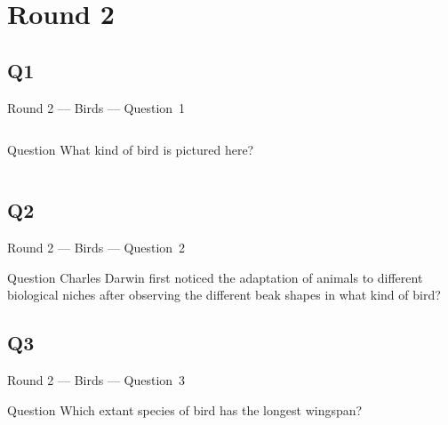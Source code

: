\documentclass[11pt]{beamer}
\begin{document}
\section{Round 2}
\subsection*{Q1}
\begin{frame}[t]{Round 2 --- Birds --- \mbox{Question 1}}
    \vspace{-0.5em}
    \begin{columns}[T,totalwidth=\linewidth]
        \begin{column}{0.32\linewidth}
            \begin{block}{Question}
                What kind of bird is pictured here?
            \end{block}
        \end{column}
        \begin{column}{0.65\linewidth}
            \begin{center}
                \texttt{[image: \{Images/starling]}.jpg}
            \end{center}
        \end{column}
    \end{columns}
\end{frame}
\subsection*{Q2}
\begin{frame}[t]{Round 2 --- Birds --- \mbox{Question 2}}
    \vspace{-0.5em}
    \begin{block}{Question}
        Charles Darwin first noticed the adaptation of animals to different biological niches after observing the different beak shapes in what kind of bird?
    \end{block}
\end{frame}
\subsection*{Q3}
\begin{frame}[t]{Round 2 --- Birds --- \mbox{Question 3}}
    \vspace{-0.5em}
    \begin{block}{Question}
        Which extant species of bird has the longest wingspan?
    \end{block}
\end{frame}
\end{document}
